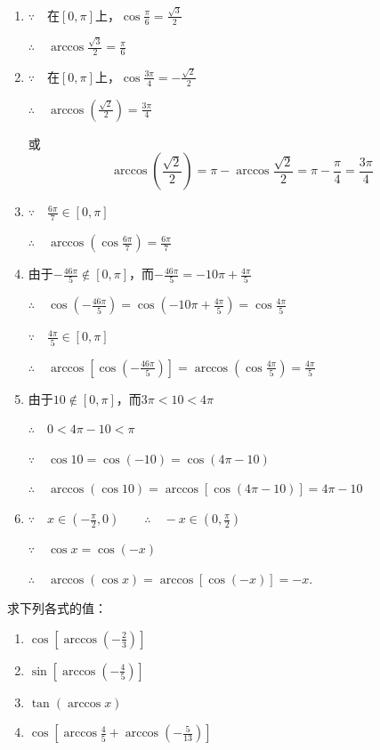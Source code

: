 \begin{solution}
\begin{enumerate}[(1)]
    \item $\because\quad$在$[0,\pi]$上，$\cos\frac{\pi}{6}=\frac{\sqrt{3}}{2}$

$\therefore\quad \arccos\frac{\sqrt{3}}{2}=\frac{\pi}{6}$

\item $\because\quad$在$[0,\pi]$上，$\cos\frac{3\pi}{4}=-\frac{\sqrt{2}}{2}$

$\therefore\quad \arccos\left(\frac{\sqrt{2}}{2}\right)=\frac{3\pi}{4}$

或
\[\arccos\left(\frac{\sqrt{2}}{2}\right)=\pi-\arccos\frac{\sqrt{2}}{2}=\pi-\frac{\pi}{4}=\frac{3\pi}{4}\]

\item $\because\quad \frac{6\pi}{7}\in [0,\pi]$

$\therefore\quad \arccos\left(\cos\frac{6\pi}{7}\right)=\frac{6\pi}{7}$

\item 由于$-\frac{46\pi}{5}\notin [0,\pi]$，而$-\frac{46\pi}{5}=-10\pi+\frac{4\pi}{5}$

$\therefore\quad \cos\left(-\frac{46\pi}{5}\right)=\cos\left(-10\pi+\frac{4\pi}{5}\right)=\cos\frac{4\pi}{5}$

$\because\quad \frac{4\pi}{5}\in[0,\pi]$
    
$\therefore\quad \arccos\left[\cos\left(-\frac{46\pi}{5}\right)\right]=\arccos\left(\cos\frac{4\pi}{5}\right)=\frac{4\pi}{5}$
    
\item 由于$10\notin [0,\pi]$，而$3\pi<10<4\pi$

$\therefore\quad 0<4\pi-10<\pi$

$\because\quad \cos10=\cos(-10)=\cos(4\pi-10)$

$\therefore\quad \arccos(\cos 10)=\arccos[\cos(4\pi-10)]=4\pi-10$

\item $\because\quad x\in\left(-\frac{\pi}{2},0\right)\qquad \therefore\quad -x\in\left(0,\frac{\pi}{2}\right)$

$\because\quad \cos x=\cos(-x)$

$\therefore\quad \arccos(\cos x)=\arccos[\cos(-x)]=-x$.
\end{enumerate}    
\end{solution}


\begin{example}
求下列各式的值：
\begin{multicols}{2}
\begin{enumerate}[(1)]
    \item $\cos\left[\arccos \left(-\frac{2}{3}\right)\right]$
    \item $\sin\left[\arccos \left(-\frac{4}{5}\right)\right]$
    \item $\tan(\arccos x)$
    \item $\cos\left[\arccos\frac{4}{5}+\arccos\left(-\frac{5}{13}\right)\right]$
\end{enumerate}    
\end{multicols}
\end{example}

